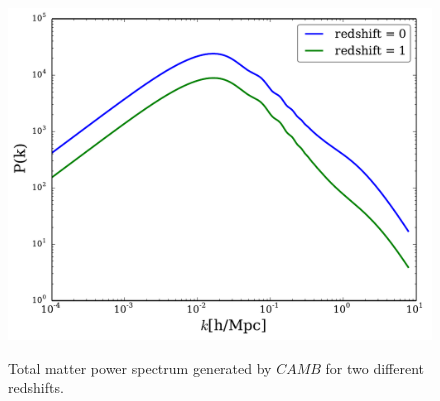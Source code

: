 \begin{figure}[H]
\includegraphics[width = \columnwidth]{figs/ps.pdf}
\label{ps}
\caption{Total matter power spectrum generated by $CAMB$ for two different redshifts.}
\end{figure}